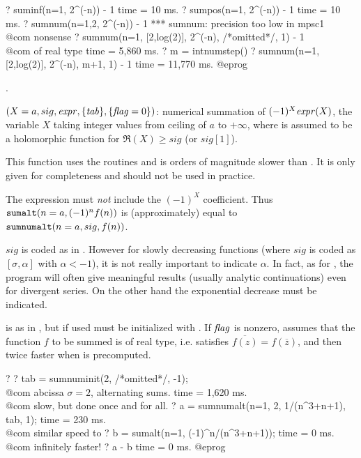 \bprog
? suminf(n=1, 2^(-n)) - 1
time = 10 ms.
? sumpos(n=1, 2^(-n)) - 1
time = 10 ms.
? sumnum(n=1,2, 2^(-n)) - 1
   *** sumnum: precision too low in mpsc1 \\@com nonsense
? sumnum(n=1, [2,log(2)], 2^(-n), /*omitted*/, 1) - 1 \\@com of real type
time = 5,860 ms.
? m = intnumstep()
? sumnum(n=1,[2,log(2)], 2^(-n), m+1, 1) - 1
time = 11,770 ms.
@eprog

.

$(X=a,sig,\hbox{\it expr\/},\{\hbox{\it tab\/}\},\{\hbox{\it f\kern0pt lag\/}=0\})$: numerical
summation of $(-1)^X\hbox{\it expr\/}(X)$, the variable $X$ taking integer values from
ceiling of $a$ to $+\infty$, where  is assumed to be a holomorphic
function for $\Re(X)\ge sig$ (or $sig[1]$).

 This function uses the  routines and is
orders of magnitude slower than . It is only given for
completeness and should not be used in practice.

 The expression  must \emph{not} include the
$(-1)^X$ coefficient. Thus ${\tt sumalt}(n=a,(-1)^nf(n))$ is (approximately)
equal to ${\tt sumnumalt}(n=a,sig,f(n))$.

$sig$ is coded as in . However for slowly decreasing functions
(where $sig$ is coded as $[\sigma,\alpha]$ with $\alpha<-1$), it is not
really important to indicate $\alpha$. In fact, as for , the
program will often give meaningful results (usually analytic continuations)
even for divergent series. On the other hand the exponential decrease must be
indicated.

 is as in , but if used must be initialized with
. If $\hbox{\it f\kern0pt lag\/}$ is nonzero, assumes that the function $f$ to be
summed is of real type, i.e. satisfies $\overline{f(z)}=f(\overline{z})$, and
then twice faster when  is precomputed.

\bprog
? 
? tab = sumnuminit(2, /*omitted*/, -1); \\@com abcissa $\sigma=2$, alternating sums.
time = 1,620 ms. \\@com slow, but done once and for all.
? a = sumnumalt(n=1, 2, 1/(n^3+n+1), tab, 1);
time = 230 ms. \\@com similar speed to 
? b = sumalt(n=1, (-1)^n/(n^3+n+1));
time = 0 ms. \\@com infinitely faster!
? a - b
time = 0 ms.
@eprog


